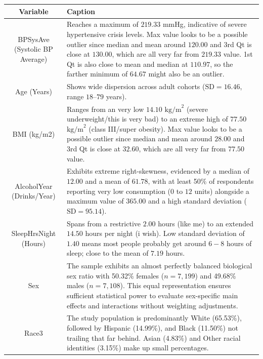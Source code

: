 \documentclass{article}
\begin{document}
\begin{center}
    \small
    \begin{tabular}{|c|>{\centering\arraybackslash}p{12cm}|}
        \hline
        Variable & Caption \\
        \hline
        BPSysAve (Systolic BP Average) & Reaches a maximum of $219.33$ mmHg, indicative of severe hypertensive crisis levels. Max value looks to be a possible outlier since median and mean around $120.00$ and 3rd Qt is close at $130.00$, which are all very far from $219.33$ value. 1st Qt is also close to mean and median at $110.97$, so the farther minimum of $64.67$ might also be an outlier. \\
        \hline
        Age (Years) & Shows wide dispersion across adult cohorts ($\text{SD} = 16.46$, range $18–79$ years). \\
        \hline
        BMI (kg/m2) & Ranges from an very low $14.10$ $\text{kg/m}^2$ (severe underweight/this is very bad) to an extreme high of $77.50$ $\text{kg/m}^2$ (class III/super obesity). Max value looks to be a possible outlier since median and mean around $28.00$ and 3rd Qt is close at $32.60$, which are all very far from $77.50$ value. \\
        \hline
        AlcoholYear (Drinks/Year) & Exhibits extreme right-skewness, evidenced by a median of $12.00$ and a mean of $61.78$, with at least 50\% of respondents reporting very low consumption ($0$ to $12$ units) alongside a maximum value of $365.00$ and a high standard deviation ($\text{SD} = 95.14$). \\
        \hline
        SleepHrsNight (Hours) & Spans from a restrictive $2.00$ hours (like me) to an extended $14.50$ hours per night (i wish). Low standard deviation of $1.40$ means most people probably get around $6-8$ hours of sleep; close to the mean of $7.19$ hours. \\
        \hline
        Sex & The sample exhibits an almost perfectly balanced biological sex ratio with 50.32\% females ($n = 7,199$) and 49.68\% males ($n = 7,108$). This equal representation ensures sufficient statistical power to evaluate sex-specific main effects and interactions without weighting adjustments. \\
        \hline
        Race3 & The study population is predominantly White (65.53\%), followed by Hispanic (14.99\%), and Black (11.50\%) not trailing that far behind. Asian (4.83\%) and Other racial identities (3.15\%) make up small percentages. \\
        \hline

\end{tabular}
\end{center}
\end{document}

